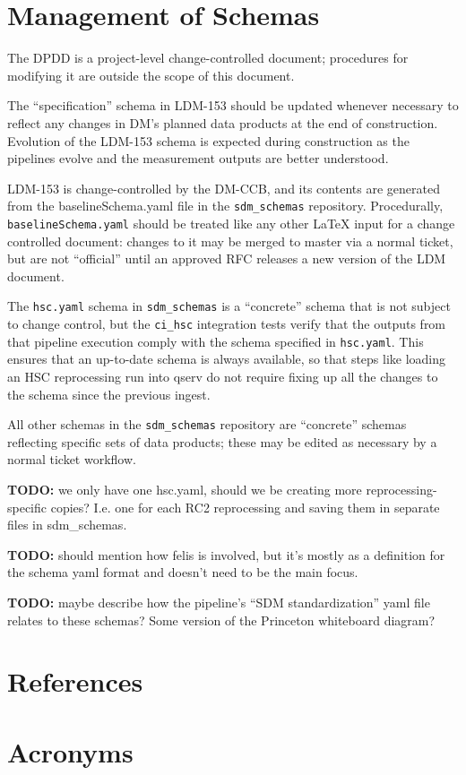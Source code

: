 \documentclass[DM,authoryear,toc]{lsstdoc}
\begin{document}
\section{Management of Schemas}


The DPDD is a project-level change-controlled document; procedures for modifying it are outside the
scope of this document.

The ``specification'' schema in LDM-153 should be updated whenever necessary to reflect any changes
in DM's planned data products at the end of construction. Evolution of the LDM-153 schema is
expected during construction as the pipelines evolve and the measurement outputs are better
understood.

LDM-153 is change-controlled by the DM-CCB, and its contents are generated from the baselineSchema.yaml file
in the \texttt{sdm\_schemas} repository. Procedurally, \texttt{baselineSchema.yaml} should be
treated like any other LaTeX input for a change controlled document: changes to it may be merged to
master via a normal ticket, but are not ``official'' until an approved RFC releases a new version of
the LDM document.

The \texttt{hsc.yaml} schema in \texttt{sdm\_schemas} is a ``concrete'' schema that is not subject
to change control, but the \texttt{ci\_hsc} integration tests verify that the outputs from that
pipeline execution comply with the schema specified in \texttt{hsc.yaml}. This ensures that an
up-to-date schema is always available, so that steps like loading an HSC reprocessing run into qserv
do not require fixing up all the changes to the schema since the previous ingest.

All other schemas in the \texttt{sdm\_schemas} repository are ``concrete'' schemas reflecting
specific sets of data products; these may be edited as necessary by a normal ticket workflow.

\textbf{TODO:} we only have one hsc.yaml, should we be creating more reprocessing-specific copies?
I.e. one for each RC2 reprocessing and saving them in separate files in sdm\_schemas.

\textbf{TODO:} should mention how felis is involved, but it's mostly as a definition for the schema
yaml format and doesn't need to be the main focus.

\textbf{TODO:} maybe describe how the pipeline's ``SDM standardization'' yaml file relates to these
schemas? Some version of the Princeton whiteboard diagram?


\appendix
\section{References} \label{sec:bib}
\renewcommand{\refname}{} %


\section{Acronyms} \label{sec:acronyms}

\end{document}

